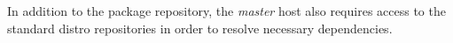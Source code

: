 In addition to the \OHPC{} package repository, the {\em master} host also
requires access to the standard distro repositories in order to resolve
necessary dependencies. 

